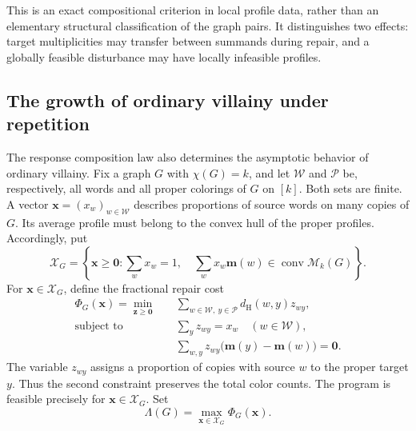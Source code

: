 \documentclass[10pt,a4paper]{amsart}
\numberwithin{equation}{section}
\theoremstyle{definition}
\theoremstyle{remark}
\begin{document}
This is an exact compositional criterion in local profile data, rather
than an elementary structural classification of the graph pairs.
It distinguishes two effects: target multiplicities may transfer
between summands during repair, and a globally feasible disturbance
may have locally infeasible profiles.

\subsection{The growth of ordinary villainy under repetition}
\label{union:ordinary-repetition-section}

The response composition law also determines the asymptotic behavior
of ordinary villainy. Fix a graph $G$ with $\chi(G)=k$, and let
$\mathcal W$ and $\mathcal P$ be, respectively, all words and all
proper colorings of $G$ on $[k]$. Both sets are finite. A vector
$\mathbf x=(x_w)_{w\in\mathcal W}$ describes proportions of source
words on many copies of $G$. Its average profile must belong to the
convex hull of the proper profiles. Accordingly, put
\[
 \mathcal X_G=\left\{\mathbf x\ge\mathbf0:
   \sum_wx_w=1,\quad
   \sum_wx_w\mathbf m(w)\in\operatorname{conv}\mathcal M_k(G)
                 \right\}.
\]
For $\mathbf x\in\mathcal X_G$, define the fractional repair cost
\begin{equation}\label{union:fractional-response}
\begin{aligned}
 \Phi_G(\mathbf x)=\min_{\mathbf z\ge\mathbf0}\quad&
   \sum_{w\in\mathcal W,\ y\in\mathcal P}d_{\mathrm H}(w,y)z_{wy},\\
 \text{subject to}\quad&\sum_yz_{wy}=x_w\quad(w\in\mathcal W),\\
 &\sum_{w,y}z_{wy}\bigl(\mathbf m(y)-\mathbf m(w)\bigr)=\mathbf0.
\end{aligned}
\end{equation}
The variable $z_{wy}$ assigns a proportion of copies with source $w$
to the proper target $y$. Thus the second constraint preserves the
total color counts. The program is feasible precisely for
$\mathbf x\in\mathcal X_G$. Set
\begin{equation}\label{union:ordinary-slope}
 \Lambda(G)=\max_{\mathbf x\in\mathcal X_G}\Phi_G(\mathbf x).
\end{equation}
\end{document}
